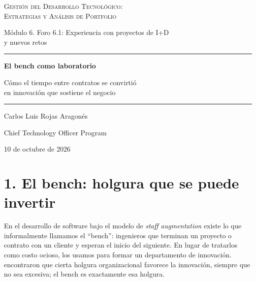 \documentclass[11pt,letterpaper]{article}
\begin{document}
\begin{titlepage}
\centering
\vspace*{3.2cm}
{\large\scshape Gestión del Desarrollo Tecnológico:\\
Estrategias y Análisis de Portfolio\par}
\vspace{0.5cm}
{\normalsize Módulo 6. Foro 6.1: Experiencia con proyectos de I+D\\
y nuevos retos\par}
\vspace{2.6cm}
{\color{cEje}\rule{0.55\textwidth}{0.8pt}\par}
\vspace{0.7cm}
{\LARGE\bfseries El bench como laboratorio\par}
\vspace{0.5cm}
{\large Cómo el tiempo entre contratos se convirtió\\
en innovación que sostiene el negocio\par}
\vspace{0.7cm}
{\color{cEje}\rule{0.55\textwidth}{0.8pt}\par}
\vfill
{\large Carlos Luis Rojas Aragonés\par}
\vspace{0.3cm}
{\normalsize Chief Technology Officer Program\par}
\vspace{0.3cm}
{\normalsize 10 de octubre de 2026\par}
\vspace*{1.5cm}
\end{titlepage}

\section*{1. El bench: holgura que se puede invertir}

En el desarrollo de software bajo el modelo de \emph{staff augmentation}
existe lo que informalmente llamamos el \enquote{bench}: ingenieros que
terminan un proyecto o contrato con un cliente y esperan el inicio del
siguiente. En lugar de tratarlos como costo ocioso, los usamos para formar un
departamento de innovación. \textcite{nohria1996} encontraron que cierta
holgura organizacional favorece la innovación, siempre que no sea excesiva;
el bench es exactamente esa holgura.
\end{document}
